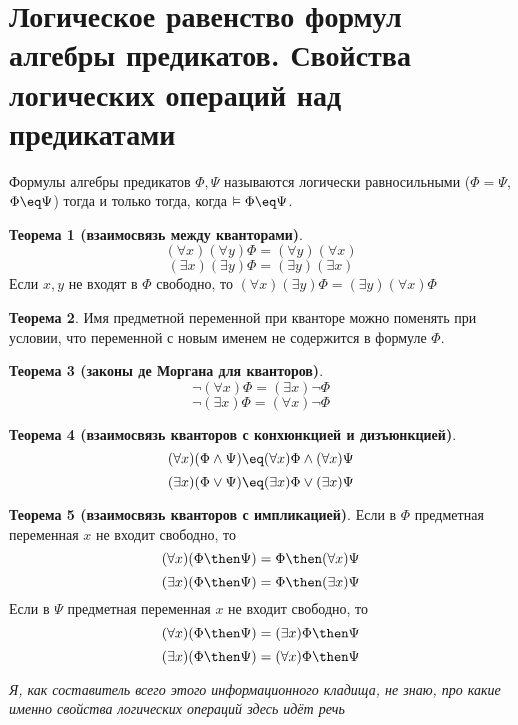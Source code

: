 \section{Логическое равенство формул алгебры предикатов. Свойства логических операций над предикатами}
\dftion Формулы алгебры предикатов $\Phi, \Psi$ называются логически равносильными ($\Phi = \Psi$, $\Phi \eq \Psi$) тогда и только тогда, когда $\vDash \Phi \eq \Psi$.

\textbf{Теорема 1 (взаимосвязь между кванторами)}.
$$(\forall x)(\forall y)\Phi = (\forall y)(\forall x)$$
$$(\exists x)(\exists y)\Phi = (\exists y)(\exists x)$$
Если $x, y$ не входят в $\Phi$ свободно, то $(\forall x)(\exists y)\Phi = (\exists y)(\forall x)\Phi$

\textbf{Теорема 2}. Имя предметной переменной при кванторе можно поменять при условии, что переменной с новым именем не содержится в формуле $\Phi$.

\textbf{Теорема 3 (законы де Моргана для кванторов)}.
$$\lnot (\forall x) \Phi = (\exists x)\lnot \Phi$$
$$\lnot (\exists x) \Phi = (\forall x)\lnot \Phi$$

\textbf{Теорема 4 (взаимосвязь кванторов с конхюнкцией и дизъюнкцией)}.
$$(\forall x)(\Phi \land \Psi) \eq (\forall x)\Phi \land (\forall x)\Psi$$
$$(\exists x)(\Phi \lor \Psi) \eq (\exists x)\Phi \lor (\exists x)\Psi$$

\textbf{Теорема 5 (взаимосвязь кванторов с импликацией)}. Если в $\Phi$ предметная переменная $x$ не входит свободно, то
$$(\forall x)(\Phi \then \Psi) = \Phi \then (\forall x)\Psi$$
$$(\exists x)(\Phi \then \Psi) = \Phi \then (\exists x)\Psi$$
Если в $\Psi$ предметная переменная $x$ не входит свободно, то
$$(\forall x)(\Phi \then \Psi) = (\exists x)\Phi \then \Psi$$
$$(\exists x)(\Phi \then \Psi) = (\forall x)\Phi \then \Psi$$

\textit{Я, как составитель всего этого информационного кладища, не знаю, про какие именно свойства логических операций здесь идёт речь}